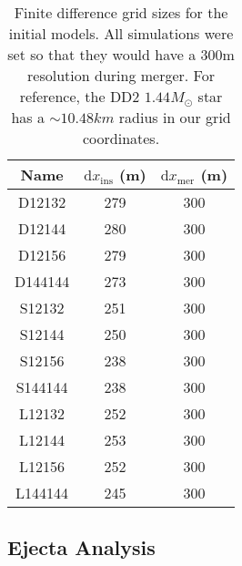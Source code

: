 \begin{table}
\centering
\begin{tabular}{ccc}\toprule
Name & $\mathrm{d}x_{\text{ins}}$ (m) & $\mathrm{d}x_{\text{mer}}$ (m) \\ \midrule
D12132 & 279 & 300 \\
D12144 & 280 & 300 \\
D12156 & 279 & 300 \\
D144144 & 273 & 300 \\ \midrule
S12132 & 251 & 300 \\
S12144 & 250 & 300 \\
S12156 & 238 & 300 \\
S144144 & 238 & 300 \\ \midrule
L12132 & 252 & 300 \\
L12144 & 253 & 300 \\
L12156 & 252 & 300 \\
L144144 & 245 & 300 \\ \bottomrule
\end{tabular}
\caption{Finite difference grid sizes for the initial models. All simulations were set so that they would have a 300m resolution during merger. For reference, the DD2 $1.44M_\odot$ star has a $\sim 10.48 km$ radius in our grid coordinates.
}
\label{tab:grid_setup}
\end{table}

\subsection{Ejecta Analysis}


